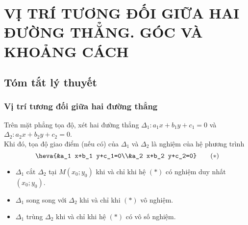 \section{VỊ TRÍ TƯƠNG ĐỐI GIỮA HAI ĐƯỜNG THẲNG. GÓC VÀ KHOẢNG CÁCH}
\subsection{Tóm tắt lý thuyết}
\subsubsection{Vị trí tương đối giữa hai đường thẳng}
	Trên mặt phẳng tọa độ, xét hai đường thẳng $\Delta_1 \colon a_1 x+b_1 y+c_1=0$ và $\Delta_2 \colon a_2 x+b_2 y+c_2=0$.\\
	Khi đó, tọa độ giao điểm (nếu có) của $\Delta_1$ và $\Delta_2$ là nghiệm của hệ phương trình
	$$\heva{&a_1 x+b_1 y+c_1=0\\&a_2 x+b_2 y+c_2=0}\qquad(*)$$
	\begin{itemize}
		\item $\Delta_1$ cắt $\Delta_2$ tại $M(x_0;y_0)$ khi và chỉ khi hệ $(*)$ có nghiệm duy nhất $(x_0;y_0)$.
		\item $\Delta_1$ song song với $\Delta_2$ khi và chỉ khi $(*)$ vô nghiệm.
		\item $\Delta_1$ trùng $\Delta_2$ khi và chỉ khi hệ $(*)$ có vô số nghiệm.
	\end{itemize}
